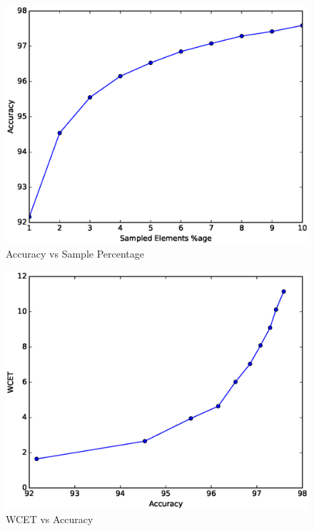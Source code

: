 \begin{figure}
  \includegraphics[width=0.95\linewidth]{Results/countnegative1.eps}
  \caption{Accuracy vs Sample Percentage}
  \label{countnegative1}
\end{figure}

\begin{figure}
  \includegraphics[width=0.95\linewidth]{Results/countnegative3.eps}
  \caption{WCET vs Accuracy}
  \label{countnegative3}
\end{figure}

